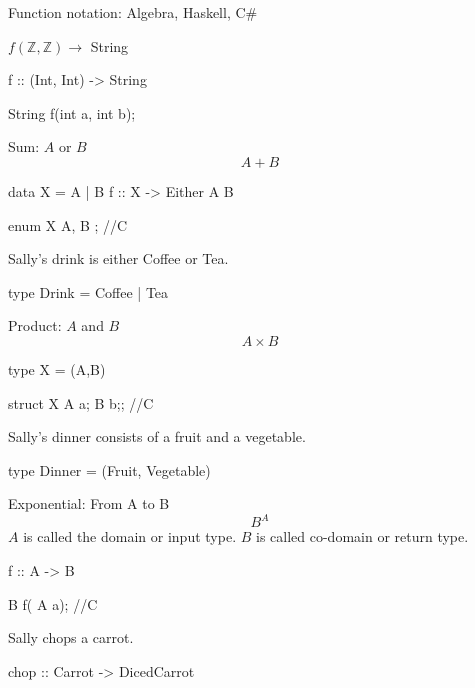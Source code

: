 \documentclass{beamer}
\begin{document}
\begin{frame}[fragile]
Function notation: Algebra, Haskell, C\#\newline\newline

$f(\mathbb{Z},\mathbb{Z}) \rightarrow$ String
\begin{code} 
f :: (Int, Int) -> String
\end{code}
\begin{ccode} 
String f(int a, int b); 
\end{ccode}
\end{frame}


\begin{frame}[fragile]
Sum: $A$ or $B$\newline\newline
$$A + B $$
\begin{code} 
data X = A | B
f :: X -> Either A B
\end{code}

\begin{ccode} 
enum X { A, B }; //C
\end{ccode}

Sally's drink is either Coffee or Tea.
\begin{code}
type Drink = Coffee | Tea
\end{code}


\end{frame}


\begin{frame}[fragile]
Product: $A$ and $B$\newline\newline
$$A \times B$$
\begin{code}
type X = (A,B)
\end{code}

\begin{ccode}
struct X{ A a; B b;}; //C
\end{ccode}

Sally's dinner consists of a fruit and a vegetable.
\begin{code}
type Dinner =  (Fruit, Vegetable)
\end{code}
\end{frame}


\begin{frame}[fragile]
Exponential: From A to B\newline\newline
$$ B^{A} $$
$A$ is called the domain or input type. $B$ is called co-domain or return type.
\begin{code}
f :: A -> B
\end{code}

\begin{ccode}
B f( A  a); //C
\end{ccode}

Sally chops a carrot.
\begin{code}
chop :: Carrot -> DicedCarrot
\end{code}

\end{frame}
\end{document}
